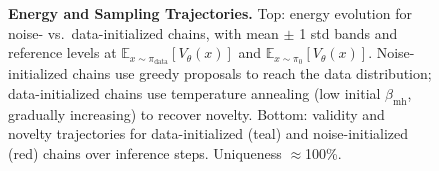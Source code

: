 \begin{figure}[t!]
\caption{\footnotesize \textbf{Energy and Sampling Trajectories.} Top: energy evolution for noise- vs.\ data-initialized chains, with mean $\pm$ 1 std bands and reference levels at $\mathbb{E}_{x\sim \pi_\mathrm{data}}[V_\theta(x)]$ and $\mathbb{E}_{x\sim \pi_0}[V_\theta(x)]$. Noise-initialized chains use greedy proposals to reach the data distribution; data-initialized chains use temperature annealing (low initial $\beta_{\mathrm{mh}}$, gradually increasing) to recover novelty.
 Bottom: validity and novelty trajectories for data-initialized (teal) and noise-initialized (red) chains over inference steps. Uniqueness $\approx$100\%.}
\label{fig:moses-energy-and-metrics}
\vspace{5pt}
\end{figure}